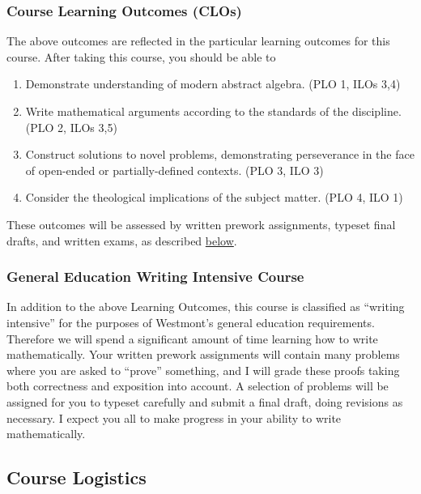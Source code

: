 \documentclass[
  twoside]{article}
\providecommand{\tightlist}{%
  \setlength{\itemsep}{0pt}\setlength{\parskip}{0pt}}
\begin{document}
\subsubsection{Course Learning Outcomes
(CLOs)}\label{course-learning-outcomes-clos}

The above outcomes are reflected in the particular learning outcomes for
this course. After taking this course, you should be able to

\begin{enumerate}
\def\labelenumi{\arabic{enumi}.}
\tightlist
\item
  Demonstrate understanding of modern abstract algebra. (PLO 1, ILOs
  3,4)
\item
  Write mathematical arguments according to the standards of the
  discipline. (PLO 2, ILOs 3,5)
\item
  Construct solutions to novel problems, demonstrating perseverance in
  the face of open-ended or partially-defined contexts. (PLO 3, ILO 3)
\item
  Consider the theological implications of the subject matter. (PLO 4,
  ILO 1)
\end{enumerate}

These outcomes will be assessed by written prework assignments, typeset
final drafts, and written exams, as described
\hyperref[course-logistics]{below}.

\subsubsection{General Education Writing Intensive
Course}\label{general-education-writing-intensive-course}

In addition to the above Learning Outcomes, this course is classified as
``writing intensive'' for the purposes of Westmont's general education
requirements. Therefore we will spend a significant amount of time
learning how to write mathematically. Your written prework assignments
will contain many problems where you are asked to ``prove'' something,
and I will grade these proofs taking both correctness and exposition
into account. A selection of problems will be assigned for you to
typeset carefully and submit a final draft, doing revisions as
necessary. I expect you all to make progress in your ability to write
mathematically.

\subsection{Course Logistics}\label{course-logistics}
\end{document}
